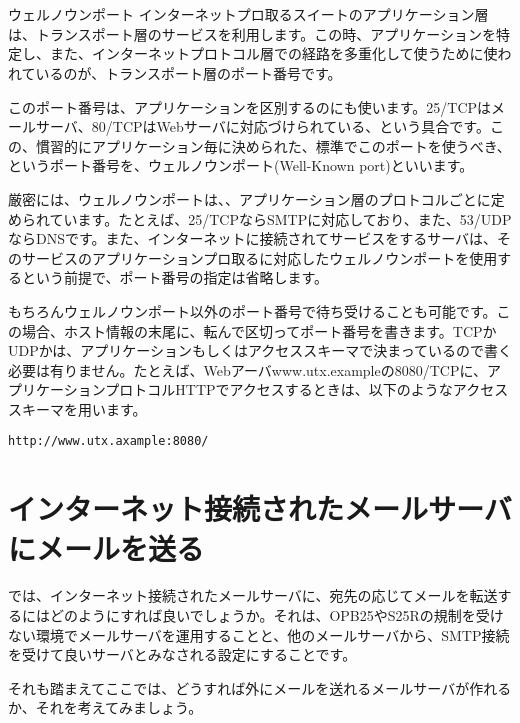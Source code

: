{\section*{}
\begin{itembox}[l]{ウェルノウンポート}
インターネットプロ取るスイートのアプリケーション層は、トランスポート層のサービスを利用します。この時、アプリケーションを特定し、また、インターネットプロトコル層での経路を多重化して使うために使われているのが、トランスポート層のポート番号です。

このポート番号は、アプリケーションを区別するのにも使います。25/TCPはメールサーバ、80/TCPはWebサーバに対応づけられている、という具合です。この、慣習的にアプリケーション毎に決められた、標準でこのポートを使うべき、というポート番号を、ウェルノウンポート(Well-Known port)といいます。

厳密には、ウェルノウンポートは、、アプリケーション層のプロトコルごとに定められています。たとえば、25/TCPならSMTPに対応しており、また、53/UDPならDNSです。また、インターネットに接続されてサービスをするサーバは、そのサービスのアプリケーションプロ取るに対応したウェルノウンポートを使用するという前提で、ポート番号の指定は省略します。

もちろんウェルノウンポート以外のポート番号で待ち受けることも可能です。この場合、ホスト情報の末尾に、転んで区切ってポート番号を書きます。TCPかUDPかは、アプリケーションもしくはアクセススキーマで決まっているので書く必要は有りません。たとえば、Webアーバwww.utx.exampleの8080/TCPに、アプリケーションプロトコルHTTPでアクセスするときは、以下のようなアクセススキーマを用います。

\begin{verbatim}
http://www.utx.axample:8080/
\end{verbatim}

\end{itembox}

\section{インターネット接続されたメールサーバにメールを送る}

では、インターネット接続されたメールサーバに、宛先の応じてメールを転送するにはどのようにすれば良いでしょうか。それは、OPB25やS25Rの規制を受けない環境でメールサーバを運用することと、他のメールサーバから、SMTP接続を受けて良いサーバとみなされる設定にすることです。

それも踏まえてここでは、どうすれば外にメールを送れるメールサーバが作れるか、それを考えてみましょう。

}
